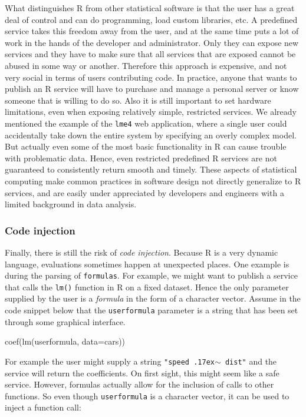 \documentclass{jss}
\newcommand{\R}{\textsf{R}\xspace}
\begin{document}
What distinguishes \R from other statistical software is that the user has a great deal of control and can do programming, load custom libraries, etc. A predefined service takes this freedom away from the user, and at the same time puts a lot of work in the hands of the developer and administrator. Only they can expose new services and they have to make sure that all services that are exposed cannot be abused in some way or another. 
Therefore this approach is expensive, and not very social in terms of users contributing code. In practice,
anyone that wants to publish an \R service will have to purchase and
manage a personal server or know someone that is willing to do so.
Also it is still important to set hardware limitations, even when exposing
relatively simple, restricted services. We already mentioned the example of the
\texttt{lme4} web application, where a single user could accidentally take down
the entire system by specifying an overly complex model. But actually even some of the most basic functionality in \R can cause trouble with problematic data. Hence, even restricted predefined \R services are not guaranteed to consistently return smooth and timely. These aspects of statistical computing make common practices in software design not directly generalize to \R services, and are easily under appreciated by developers and engineers with a limited background in data analysis. 

\subsubsection{Code injection}

Finally, there is still the risk of \emph{code injection}. Because \R
is a very dynamic language, evaluations sometimes happen at unexpected places.
One example is during the parsing of \texttt{formulas}. For example, we might
want to publish a service that calls the \texttt{lm()} function in \R
on a fixed dataset. Hence the only parameter supplied by the user is a \emph{formula}
in the form of a character vector. Assume in the code snippet below that
the \texttt{userformula} parameter is a string that has been set through
some graphical interface.

\begin{CodeChunk}
\begin{CodeInput}
coef(lm(userformula, data=cars))
\end{CodeInput}
\end{CodeChunk}

For example the user might supply a string \texttt{"speed
{\raise.17ex\hbox{$\scriptstyle\sim$}} dist"} and the service will return the
coefficients. On first sight, this might seem like a safe service. However,
formulas actually allow for the inclusion of calls to other functions. So even though \texttt{userformula} is a character vector, it can be used to inject a
function call:
\end{document}
